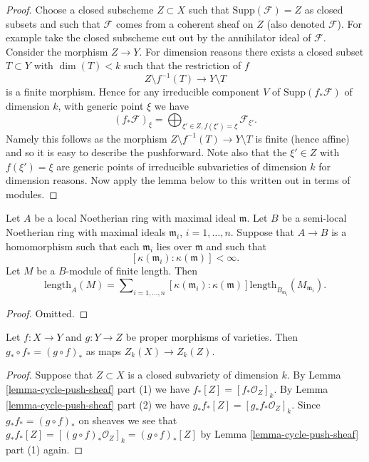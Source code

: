\begin{proof}
Choose a closed subscheme $Z \subset X$ such that
$\text{Supp}(\mathcal{F}) = Z$ as closed subsets and such
that $\mathcal{F}$ comes from a coherent sheaf on $Z$
(also denoted $\mathcal{F}$). For example take the closed subscheme
cut out by the annihilator ideal of $\mathcal{F}$. Consider the
morphism $Z \to Y$. For dimension reasons there exists a closed
subset $T \subset Y$ with $\dim(T) < k$ such that the restriction of $f$
$$
Z \setminus f^{-1}(T) \longrightarrow Y \setminus T
$$
is a finite morphism. Hence for any irreducible component $V$
of $\text{Supp}(f_*\mathcal{F})$ of dimension $k$, with generic point $\xi$
we have
$$
(f_*\mathcal{F})_\xi
=
\bigoplus\nolimits_{\xi' \in Z, f(\xi') = \xi} \mathcal{F}_{\xi'}.
$$
Namely this follows as the morphism
$Z \setminus f^{-1}(T) \longrightarrow Y \setminus T$ is finite (hence affine)
and so it is easy to describe the pushforward.
Note also that the $\xi' \in Z$ with $f(\xi') = \xi$ are generic points
of irreducible subvarieties of dimension $k$ for dimension reasons.
Now apply the lemma below to
this written out in terms of modules.
\end{proof}

\begin{lemma}
\label{lemma-cycle-push-sheaf-algebra}
Let $A$ be a local Noetherian ring with maximal ideal $\mathfrak m$.
Let $B$ be a semi-local Noetherian ring with maximal ideals $\mathfrak m_i$,
$i = 1, \ldots, n$.
Suppose that $A \to B$ is a homomorphism such that each $\mathfrak m_i$
lies over $\mathfrak m$ and such that
$$
[\kappa(\mathfrak m_i) : \kappa(\mathfrak m)] < \infty.
$$
Let $M$ be a $B$-module of finite length.
Then
$$
\text{length}_A(M) = \sum\nolimits_{i = 1, \ldots, n}
[\kappa(\mathfrak m_i) : \kappa(\mathfrak m)]
\text{length}_{B_{\mathfrak m_i}}(M_{\mathfrak m_i}).
$$
\end{lemma}

\begin{proof}
Omitted.
\end{proof}

\begin{lemma}
\label{lemma-compose-pushforward}
Let $f : X \to Y$ and $g : Y \to Z$ be proper morphisms of varieties.
Then $g_* \circ f_* = (g \circ f)_*$ as maps $Z_k(X) \to Z_k(Z)$.
\end{lemma}

\begin{proof}
Suppose that $Z \subset X$ is a closed subvariety of dimension $k$.
By Lemma \ref{lemma-cycle-push-sheaf} part (1) we have $f_*[Z] = [f_*\mathcal{O}_Z]_k$.
By Lemma \ref{lemma-cycle-push-sheaf} part (2) we have $g_*f_*[Z] = [g_*f_*\mathcal{O}_Z]_k$.
Since $g_*f_* = (g \circ f)_*$ on sheaves we see that
$g_*f_*[Z] = [(g \circ f)_*\mathcal{O}_Z]_k = (g \circ f)_*[Z]$
by Lemma \ref{lemma-cycle-push-sheaf} part (1) again.
\end{proof}











